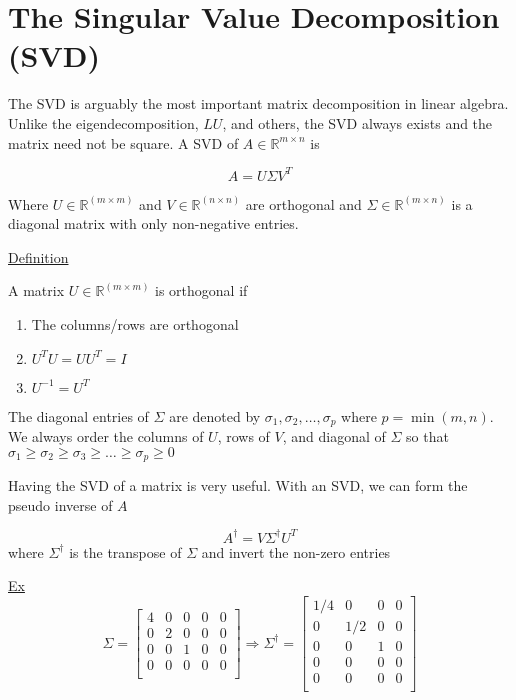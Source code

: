 
\section{The Singular Value Decomposition (SVD)}


The SVD is arguably the most important matrix decomposition in linear algebra.
Unlike the eigendecomposition, $LU$, and others, the SVD always exists and the
matrix need not be square. A SVD of $A\in\mathbb{R}^{m \times n}$ is

\begin{equation*}
A= U \Sigma V^{T}
\end{equation*}

Where $U\in \mathbb{R}^{(m \times m)}$ and $V \in \mathbb{R}^{(n \times n)}$ are
orthogonal and $\Sigma\in\mathbb{R}^{(m \times n)}$ is a diagonal matrix with
only non-negative entries.

\underline{Definition}

A matrix $U\in \mathbb{R}^{(m \times m)}$ is orthogonal if
\begin{enumerate}[1)]
\item The columns/rows are orthogonal
\item $U^{T}U = UU^{T} = I$
\item $U^{-1} = U^{T}$
\end{enumerate}

The diagonal entries of $\Sigma$ are denoted by $\sigma_1, \sigma_2, \ldots,
\sigma_p$ where $p=\min(m, n)$. We always order the columns of $U$, rows of
$V$, and diagonal of $\Sigma$ so that $\sigma_1 \geq \sigma_2 \geq \sigma_3 \geq
\ldots \geq \sigma_p \geq 0$

Having the SVD of a matrix is very useful. With an SVD, we can form the pseudo
inverse of $A$

\begin{equation*}
A^\dagger  = V \Sigma^\dagger U^T
\end{equation*}
where $\Sigma^\dagger$ is the transpose of $\Sigma$ and invert the non-zero
entries


\underline{Ex}
\begin{equation*}
  \Sigma =
  \begin{bmatrix}
    4 & 0 & 0 & 0 & 0 \\
    0 & 2 & 0 & 0 & 0 \\
    0 & 0 & 1 & 0 & 0 \\
    0 & 0 & 0 & 0 & 0 \\
  \end{bmatrix} \Rightarrow
  \Sigma^\dagger =
  \begin{bmatrix}
    1/4 & 0   & 0 & 0  \\
    0   & 1/2 & 0 & 0  \\
    0   & 0   & 1 & 0  \\
    0   & 0   & 0 & 0  \\
    0   & 0   & 0 & 0  \\
  \end{bmatrix}
\end{equation*}



